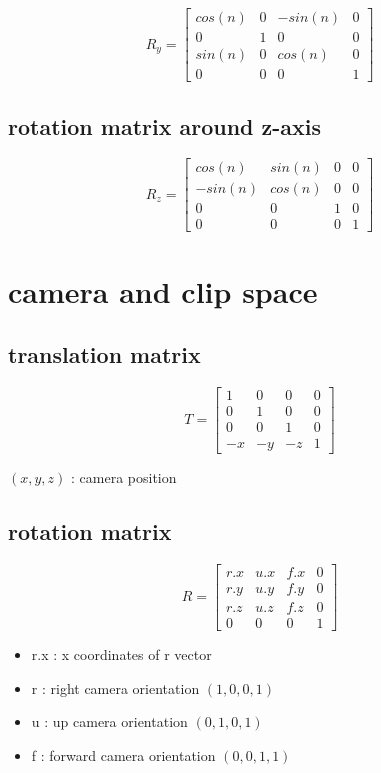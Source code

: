 \documentclass[12pt]{article}
\begin{document}
$$
R_y = 
\begin{bmatrix}
cos(n) & 0 & -sin(n) & 0 \\
0 & 1 & 0 & 0 \\
sin(n) & 0 & cos(n) & 0 \\
0 & 0 & 0 & 1
\end{bmatrix}
$$

\subsection {rotation matrix around z-axis}

$$
R_z = 
\begin{bmatrix}
cos(n) & sin(n) & 0 & 0 \\
-sin(n) & cos(n) & 0 & 0 \\
0 & 0 & 1 & 0 \\
0 & 0 & 0 & 1
\end{bmatrix}
$$

\newpage

\section{camera and clip space}

\subsection {translation matrix}

$$
T = 
\begin{bmatrix}
1 & 0 & 0 & 0 \\
0 & 1 & 0 & 0 \\
0 & 0 & 1 & 0 \\
-x & -y & -z & 1
\end{bmatrix}
$$

$(x, y, z)$ : camera position

\subsection {rotation matrix}

$$
R = 
\begin{bmatrix}
r.x & u.x & f.x & 0 \\
r.y & u.y & f.y & 0 \\
r.z & u.z & f.z & 0 \\
0 & 0 & 0 & 1
\end{bmatrix}
$$

\begin{itemize}
\item r.x : x coordinates of r vector
\item r : right camera orientation $(1, 0, 0, 1)$
\item u : up camera orientation $(0, 1, 0, 1)$
\item f : forward camera orientation $(0, 0, 1, 1)$
\end{itemize}
\end{document}
